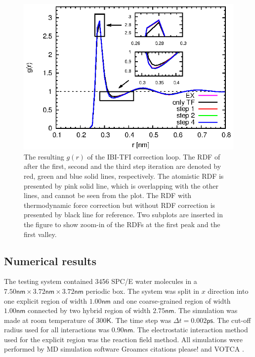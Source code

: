 \documentclass[aps,pre,preprint,unsortedaddress]{revtex4}
\newcommand{\redc}[1]{{\color{red} #1}}
\begin{document}
\begin{figure}
  \centering
  \includegraphics{fig.3/rdf.eps}
  \caption{The resulting $g(r)$ of the IBI-TFI correction loop.  The
    RDF of after the first, second and the third step iteration are
    denoted by red, green and blue solid lines, respectively.  The
    atomistic RDF is presented by pink solid line, which is
    overlapping with the other lines, and cannot be seen from the
    plot. The RDF with thermodynamic force correction but without RDF
    correction is presented by black line for reference. Two subplots
    are inserted in the figure to show zoom-in of the RDFs at the
    first peak and the first valley.}
  \label{fig:tmp4}
\end{figure}


\subsection{Numerical results}

The testing system contained 3456 SPC/E \cite{berendsen1987missing}
water molecules in a $7.50\textsf{nm}\times 3.72\textsf{nm}\times
3.72\textsf{nm}$ periodic box. The system was split in $x$ direction
into one explicit region of width $1.00\textsf{nm}$ and one
coarse-grained region of width $1.00\textsf{nm}$ connected by two
hybrid region of width $2.75\textsf{nm}$. The simulation was made at
room temperature of $300\textsf{K}$. The time step was $\Delta t =
0.002\textsf{ps}$. The cut-off radius used for all interactions was
$0.90\textsf{nm}$. The electrostatic interaction method used for the
explicit region was the reaction field method. All simulations were
performed by MD simulation software Groamcs \redc{citations please!}
and VOTCA \cite{ruehle2009versatile}.
\end{document}
